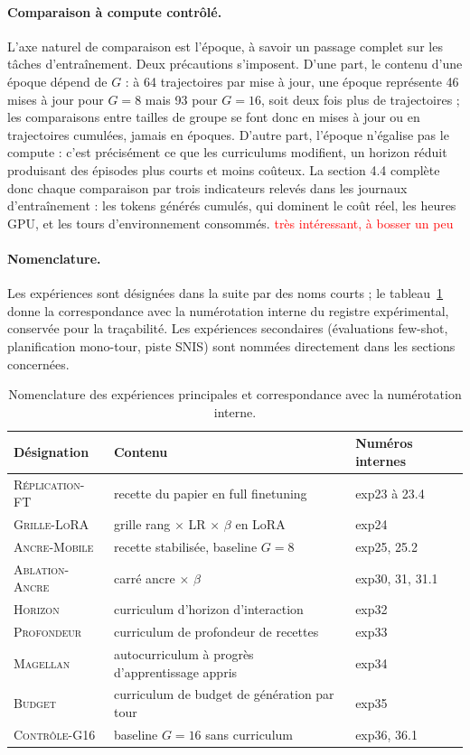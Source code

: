 \documentclass[11pt,a4paper]{article}
\begin{document}
\paragraph{Comparaison à compute contrôlé.} L'axe naturel de comparaison est l'époque, à savoir un passage complet sur les tâches d'entraînement. Deux précautions s'imposent. D'une part, le contenu d'une époque dépend de $G$ : à 64 trajectoires par mise à jour, une époque représente 46 mises à jour pour $G=8$ mais 93 pour $G=16$, soit deux fois plus de trajectoires ; les comparaisons entre tailles de groupe se font donc en mises à jour ou en trajectoires cumulées, jamais en époques. D'autre part, l'époque n'égalise pas le compute : c'est précisément ce que les curriculums modifient, un horizon réduit produisant des épisodes plus courts et moins coûteux. La section 4.4 complète donc chaque comparaison par trois indicateurs relevés dans les journaux d'entraînement : les tokens générés cumulés, qui dominent le coût réel, les heures GPU, et les tours d'environnement consommés. \textcolor{red}{très intéressant, à bosser un peu}

\paragraph{Nomenclature.} Les expériences sont désignées dans la suite par des noms courts ; le tableau~\ref{tab:nomenclature} donne la correspondance avec la numérotation interne du registre expérimental, conservée pour la traçabilité. Les expériences secondaires (évaluations few-shot, planification mono-tour, piste SNIS) sont nommées directement dans les sections concernées.

\begin{table}[htbp]
\centering
\caption{Nomenclature des expériences principales et correspondance avec la numérotation interne.}
\label{tab:nomenclature}
\begin{tabular}{lll}
\toprule
Désignation & Contenu & Numéros internes \\
\midrule
\textsc{Réplication-FT} & recette du papier en full finetuning & exp23 à 23.4 \\
\textsc{Grille-LoRA} & grille rang $\times$ LR $\times$ $\beta$ en LoRA & exp24 \\
\textsc{Ancre-Mobile} & recette stabilisée, baseline $G=8$ & exp25, 25.2 \\
\textsc{Ablation-Ancre} & carré ancre $\times$ $\beta$ & exp30, 31, 31.1 \\
\textsc{Horizon} & curriculum d'horizon d'interaction & exp32 \\
\textsc{Profondeur} & curriculum de profondeur de recettes & exp33 \\
\textsc{Magellan} & autocurriculum à progrès d'apprentissage appris & exp34 \\
\textsc{Budget} & curriculum de budget de génération par tour & exp35 \\
\textsc{Contrôle-G16} & baseline $G=16$ sans curriculum & exp36, 36.1 \\
\bottomrule
\end{tabular}
\end{table}
\end{document}
